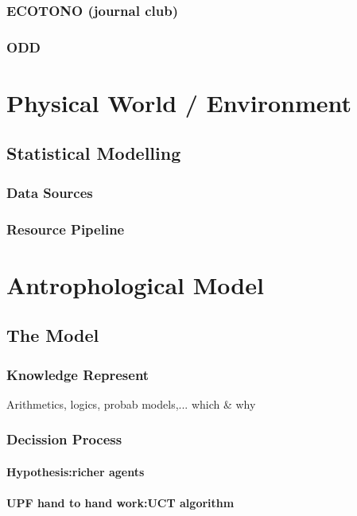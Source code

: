 \documentclass{report}
\begin{document}
		\subsubsection{ECOTONO (journal club)}	
		\subsubsection{ODD}

	\section{Physical World / Environment}		%
		\subsection{Statistical Modelling}
			\subsubsection{Data Sources}
			\subsubsection{Resource Pipeline}
			
	\section{Antrophological Model}				%
		\subsection{The Model}
			\subsubsection{Knowledge Represent}
				Arithmetics, logics, probab models,... which \& why
				
			\subsubsection{Decission Process}
				\paragraph{Hypothesis:richer agents}
				\paragraph{UPF hand to hand work:UCT algorithm}
\end{document}

